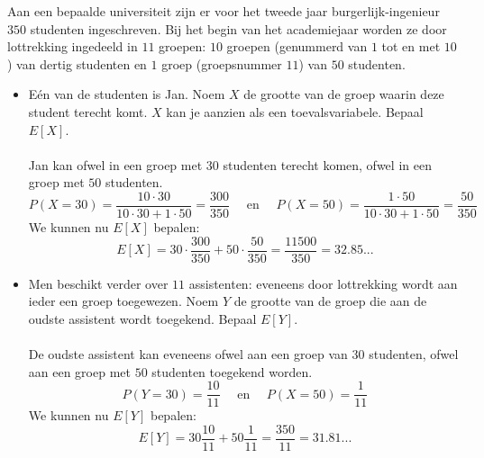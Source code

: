 \documentclass[main.tex]{subfiles}
\begin{document}
\begin{oef}
  Aan een bepaalde universiteit zijn er voor het tweede jaar burgerlijk-ingenieur $350$ studenten ingeschreven.
  Bij het begin van het academiejaar worden ze door lottrekking ingedeeld in $11$ groepen: $10$ groepen (genummerd van $1$ tot en met $10$) van dertig studenten en $1$ groep (groepsnummer $11$) van $50$ studenten.

  \begin{itemize}
  \item  E\'en van de studenten is Jan. Noem $X$ de grootte van de groep waarin deze student terecht komt.
    $X$ kan je aanzien als een toevalsvariabele. 
    Bepaal $E[X]$.\\\\
    Jan kan ofwel in een groep met $30$ studenten terecht komen, ofwel in een groep met $50$ studenten.
    \[ P(X=30) = \frac{10\cdot 30}{10 \cdot 30 + 1 \cdot 50} = \frac{300}{350} \quad\text{ en }\quad P(X=50) = \frac{1\cdot 50}{10 \cdot 30 + 1 \cdot 50} = \frac{50}{350} \]
    We kunnen nu $E[X]$ bepalen:
    \[ E[X] = 30 \cdot \frac{300}{350} + 50 \cdot \frac{50}{350} = \frac{11500}{350} = 32.85... \]
  \item  Men beschikt verder over $11$ assistenten: eveneens door lottrekking wordt aan ieder een groep toegewezen.
    Noem $Y$ de grootte van de groep die aan de oudste assistent wordt toegekend.
    Bepaal $E[Y]$.\\\\
    De oudste assistent kan eveneens ofwel aan een groep van $30$ studenten, ofwel aan een groep met $50$ studenten toegekend worden.
    \[ P(Y=30) = \frac{10}{11} \quad\text{ en }\quad P(X=50) = \frac{1}{11} \]
    We kunnen nu $E[Y]$ bepalen:
    \[ E[Y] = 30\frac{10}{11} + 50\frac{1}{11} = \frac{350}{11} = 31.81... \]
  \end{itemize}
\end{oef}
\end{document}
